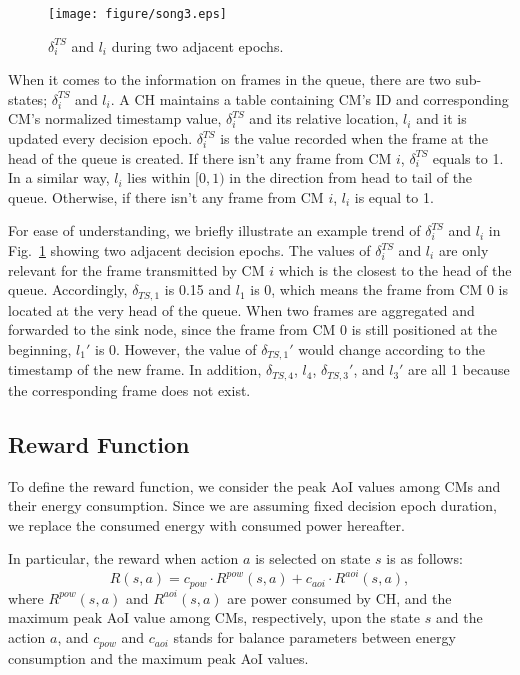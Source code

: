 \documentclass[journal]{IEEEtran}
\begin{document}
\begin{figure}
\centering
\texttt{[image: figure/song3.eps]}
\caption{$\delta^{TS}_{i}$ and $l_{i}$ during two adjacent epochs.}
\label{fig:delta}
\end{figure}

When it comes to the information on frames in the queue, there are two sub-states; $\delta^{TS}_{i}$ and ${l_i}$. A CH maintains a table containing CM's ID and corresponding CM's normalized timestamp value, $\delta^{TS}_{i}$ and its relative location, $l_i$ and it is updated every decision epoch. $\delta^{TS}_{i}$ is the value recorded when the frame at the head of the queue is created. If there isn't any frame from CM $i$, $\delta^{TS}_{i}$ equals to 1. In a similar way, $l_i$ lies within $[0, 1)$ in the direction from head to tail of the queue. Otherwise, if there isn't any frame from CM $i$, $l_i$ is equal to 1.

For ease of understanding, we briefly illustrate an example trend of $\delta^{TS}_{i}$ and $l_i$ in Fig.~\ref{fig:delta} showing two adjacent decision epochs. The values of $\delta^{TS}_{i}$ and $l_i$ are only relevant for the frame transmitted by CM $i$ which is the closest to the head of the queue. Accordingly, $\delta_{TS, 1}$ is 0.15 and $l_1$ is 0, which means the frame from CM 0 is located at the very head of the queue. When two frames are aggregated and forwarded to the sink node, since the frame from CM 0 is still positioned at the beginning, $l_1'$ is 0. However, the value of $\delta_{TS, 1}'$ would change according to the timestamp of the new frame. In addition, $\delta_{TS, 4}$, $l_4$, $\delta_{TS, 3}'$, and $l_3'$ are all 1 because the corresponding frame does not exist.


\subsection{Reward Function}
\label{subsec:reward}
To define the reward function, we consider the peak AoI values among CMs and their energy consumption. Since we are assuming fixed decision epoch duration, we replace the consumed energy with consumed power hereafter.

In particular, the reward when action $a$ is selected on state $s$ is as follows:
\begin{equation}
R(s, a) = c_{pow} \cdot R^{pow}(s, a) + c_{aoi} \cdot R^{aoi}(s, a),
\label{eq:reward}
\end{equation}
where $R^{pow}(s, a)$ and $R^{aoi}(s, a)$ are power consumed by CH, and the maximum peak AoI value among CMs, respectively, upon the state $s$ and the action $a$, and $c_{pow}$ and $c_{aoi}$ stands for balance parameters between energy consumption and the maximum peak AoI values.
\end{document}
